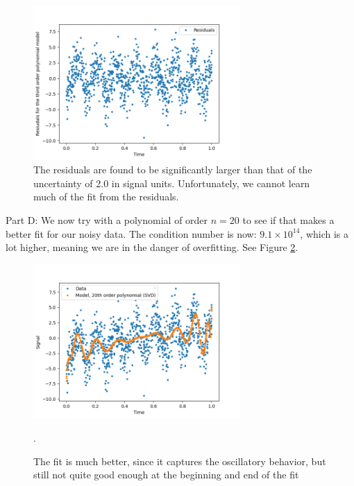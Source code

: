 \documentclass[11pt]{article}
\begin{document}
\begin{figure}[!htbp]
    \centering
    \includegraphics[width=0.7\textwidth]{residuals.png}
    \caption{The residuals are found to be significantly larger than that of the uncertainty of 2.0 in signal units. Unfortunately, we cannot learn much of the fit from the residuals.}
    \label{res}
\end{figure}

Part D:
We now try with a polynomial of order $n=20$ to see if that makes a better fit for our noisy data. The condition number is now: $9.1 \times 10^{14}$, which is a lot higher, meaning we are in the danger of overfitting. See Figure \ref{30}.
\begin{figure}[!htbp]
    \centering
    \includegraphics[width=0.7\textwidth]{model30.png}
    \caption{The fit is much better, since it captures the oscillatory behavior, but still not quite good enough at the beginning and end of the fit}.

    \label{30}
\end{figure}
\end{document}
